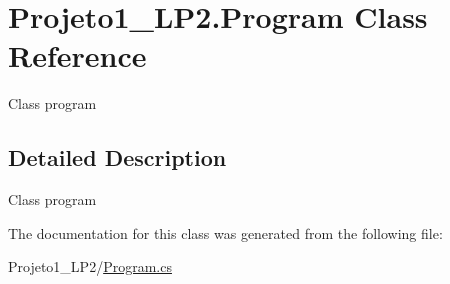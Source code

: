 \hypertarget{class_projeto1___l_p2_1_1_program}{}\section{Projeto1\+\_\+\+L\+P2.\+Program Class Reference}
\label{class_projeto1___l_p2_1_1_program}


Class program  




\subsection{Detailed Description}
Class program 



The documentation for this class was generated from the following file\+:\begin{DoxyCompactItemize}
\item 
Projeto1\+\_\+\+L\+P2/\hyperlink{_program_8cs}{Program.\+cs}\end{DoxyCompactItemize}
